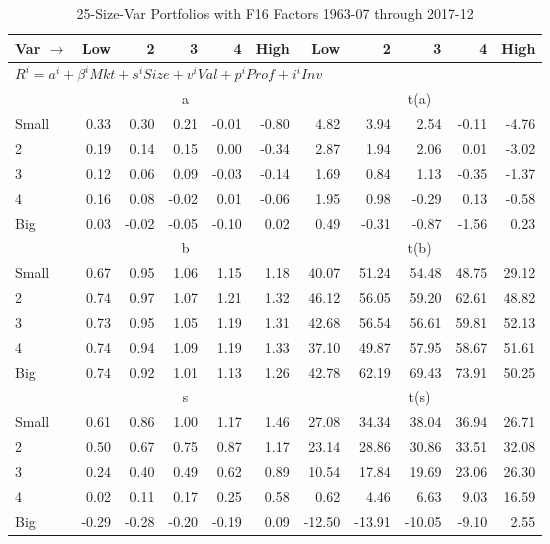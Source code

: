 
\begin{table}[H]
\footnotesize
\centering
\caption{25-Size-Var Portfolios with F16 Factors 1963-07 through 2017-12}
\begin{tabular}{lrrrrrrrrrr}
  \toprule
    
    Var $\rightarrow$ & Low & 2 & 3 & 4 & High & Low & 2 & 3 & 4 & High  \\ 
  \midrule
  \multicolumn{11}{l}{$R^i=a^i+\beta^iMkt+s^iSize+v^iVal+p^iProf+i^iInv$}  \\
  
     & \multicolumn{5}{c}{a} & \multicolumn{5}{c}{t(a)}   \\
     \cmidrule(r){2-6} \cmidrule(r){7-11} 
    Small  & 0.33  & 0.30  & 0.21  & -0.01  & -0.80  & 4.82  & 3.94  & 2.54  & -0.11  & -4.76   \\
    2  & 0.19  & 0.14  & 0.15  & 0.00  & -0.34  & 2.87  & 1.94  & 2.06  & 0.01  & -3.02   \\
    3  & 0.12  & 0.06  & 0.09  & -0.03  & -0.14  & 1.69  & 0.84  & 1.13  & -0.35  & -1.37   \\
    4  & 0.16  & 0.08  & -0.02  & 0.01  & -0.06  & 1.95  & 0.98  & -0.29  & 0.13  & -0.58   \\
    Big  & 0.03  & -0.02  & -0.05  & -0.10  & 0.02  & 0.49  & -0.31  & -0.87  & -1.56  & 0.23   \\
    
  
     & \multicolumn{5}{c}{b} & \multicolumn{5}{c}{t(b)}   \\
     \cmidrule(r){2-6} \cmidrule(r){7-11} 
    Small  & 0.67  & 0.95  & 1.06  & 1.15  & 1.18  & 40.07  & 51.24  & 54.48  & 48.75  & 29.12   \\
    2  & 0.74  & 0.97  & 1.07  & 1.21  & 1.32  & 46.12  & 56.05  & 59.20  & 62.61  & 48.82   \\
    3  & 0.73  & 0.95  & 1.05  & 1.19  & 1.31  & 42.68  & 56.54  & 56.61  & 59.81  & 52.13   \\
    4  & 0.74  & 0.94  & 1.09  & 1.19  & 1.33  & 37.10  & 49.87  & 57.95  & 58.67  & 51.61   \\
    Big  & 0.74  & 0.92  & 1.01  & 1.13  & 1.26  & 42.78  & 62.19  & 69.43  & 73.91  & 50.25   \\
    
  
     & \multicolumn{5}{c}{s} & \multicolumn{5}{c}{t(s)}   \\
     \cmidrule(r){2-6} \cmidrule(r){7-11} 
    Small  & 0.61  & 0.86  & 1.00  & 1.17  & 1.46  & 27.08  & 34.34  & 38.04  & 36.94  & 26.71   \\
    2  & 0.50  & 0.67  & 0.75  & 0.87  & 1.17  & 23.14  & 28.86  & 30.86  & 33.51  & 32.08   \\
    3  & 0.24  & 0.40  & 0.49  & 0.62  & 0.89  & 10.54  & 17.84  & 19.69  & 23.06  & 26.30   \\
    4  & 0.02  & 0.11  & 0.17  & 0.25  & 0.58  & 0.62  & 4.46  & 6.63  & 9.03  & 16.59   \\
    Big  & -0.29  & -0.28  & -0.20  & -0.19  & 0.09  & -12.50  & -13.91  & -10.05  & -9.10  & 2.55   \\
    

\end{tabular}
\end{table}
